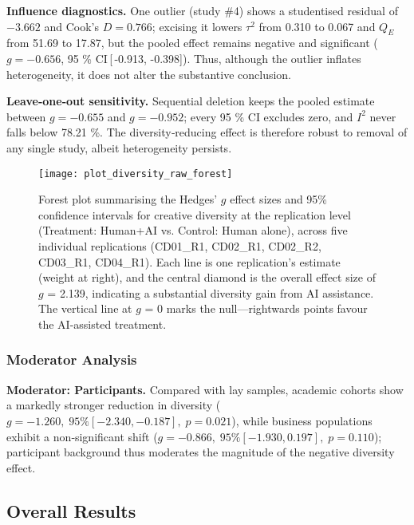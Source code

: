 \documentclass[manuscript, screen, review, acmsmall, anonymous]{acmart}
\begin{document}
\textbf{Influence diagnostics.} One outlier (study \#4) shows a studentised residual of $-3.662$ and Cook’s $D = 0.766$; excising it lowers $\tau^{2}$ from 0.310 to 0.067 and $Q_{E}$ from 51.69 to 17.87, but the pooled effect remains negative and significant ($g = -0.656$, 95 \% CI\,[\,-0.913, -0.398]). Thus, although the outlier inflates heterogeneity, it does not alter the substantive conclusion. 

\textbf{Leave‑one‑out sensitivity.} Sequential deletion keeps the pooled estimate between $g = -0.655$ and $g = -0.952$; every 95 \% CI excludes zero, and $I^{2}$ never falls below 78.21 \%. The diversity‑reducing effect is therefore robust to removal of any single study, albeit heterogeneity persists. 


\begin{figure}[H]
  \centering
  \texttt{[image: plot\_diversity\_raw\_forest]}
  \caption{Forest plot summarising the Hedges' $g$ effect sizes and 95\% confidence intervals for creative diversity at the replication level (Treatment: Human+AI vs. Control: Human alone), across five individual replications (CD01\_R1, CD02\_R1, CD02\_R2, CD03\_R1, CD04\_R1). Each line is one replication's estimate (weight at right), and the central diamond is the overall effect size of $g$ = 2.139, indicating a substantial diversity gain from AI assistance. The vertical line at $g$ = 0 marks the null—rightwards points favour the AI-assisted treatment.}
  \label{fig:diversity_raw_forest}
\end{figure}

\subsubsection{Moderator Analysis}
\label{sec:CreativeDiversity_Moderator_GenAI}

\textbf{Moderator: Participants.} Compared with lay samples, academic cohorts show a markedly stronger reduction in diversity (\(g = -1.260,\;95\% [-2.340, -0.187],\;p = 0.021\)), while business populations exhibit a non‑significant shift (\(g = -0.866,\;95\% [-1.930, 0.197],\;p = 0.110\)); participant background thus moderates the magnitude of the negative diversity effect. 

\newpage

\subsection{Overall Results}


\begin{table}[H]
  \centering
  
\end{table}
\end{document}
